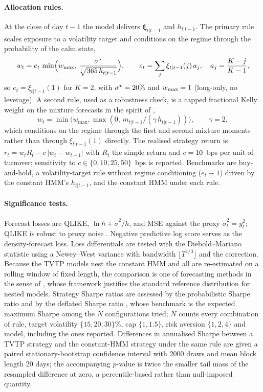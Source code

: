 \documentclass[11pt,a4paper]{article}
\newcommand{\bxi}{\bm{\xi}}
\begin{document}
\paragraph{Allocation rules.} At the close of day $t-1$ the model delivers $\bxi_{t|t-1}$ and $h_{t|t-1}$. The primary rule scales exposure to a volatility target and conditions on the regime through the probability of the calm state,
\begin{equation}\label{eq:rule}
w_t=e_t\,\min\Bigl(w_{\max},\,\frac{\sigma^\star}{\sqrt{365\,h_{t|t-1}}}\Bigr),\qquad e_t=\sum_j\xi_{t|t-1}(j)\,a_j,\quad a_j=\frac{K-j}{K-1},
\end{equation}
so $e_t=\xi_{t|t-1}(1)$ for $K=2$, with $\sigma^\star=20\%$ and $w_{\max}=1$ (long-only, no leverage). A second rule, used as a robustness check, is a capped fractional Kelly weight on the mixture forecasts in the spirit of \citet{angbekaert2002},
\begin{equation}\label{eq:kelly}
w_t=\min\bigl(w_{\max},\max(0,\,m_{t|t-1}/(\gamma\,h_{t|t-1}))\bigr),\qquad\gamma=2,
\end{equation}
which conditions on the regime through the first and second mixture moments rather than through $\xi_{t|t-1}(1)$ directly. The realised strategy return is $r_t=w_tR_t-c\,|w_t-w_{t-1}|$ with $R_t$ the simple return and $c=10$~bps per unit of turnover; sensitivity to $c\in\{0,10,25,50\}$~bps is reported. Benchmarks are buy-and-hold, a volatility-target rule without regime conditioning ($e_t\equiv1$) driven by the constant HMM's $h_{t|t-1}$, and the constant HMM under each rule.

\paragraph{Significance tests.} Forecast losses are QLIKE, $\ln h+\tilde\sigma^2/h$, and MSE against the proxy $\tilde\sigma^2_t=y_t^2$; QLIKE is robust to proxy noise \citep{patton2011}. Negative predictive log score serves as the density-forecast loss. Loss differentials are tested with the Diebold--Mariano statistic using a Newey--West variance \citep{neweywest1987} with bandwidth $\lfloor T^{1/3}\rfloor$ and the \citet{hln1997} correction. Because the TVTP models nest the constant HMM and all are re-estimated on a rolling window of fixed length, the comparison is one of forecasting methods in the sense of \citet{giacominiwhite2006}, whose framework justifies the standard reference distribution for nested models. Strategy Sharpe ratios are assessed by the probabilistic Sharpe ratio \citep{bailey2012psr} and by the deflated Sharpe ratio \citep{bailey2014dsr}, whose benchmark is the expected maximum Sharpe among the $N$ configurations tried; $N$ counts every combination of rule, target volatility $\{15,20,30\}\%$, cap $\{1,1.5\}$, risk aversion $\{1,2,4\}$ and model, including the ones reported. Differences in annualised Sharpe between a TVTP strategy and the constant-HMM strategy under the same rule are given a paired stationary-bootstrap confidence interval \citep{politisromano1994} with 2000 draws and mean block length 20 days; the accompanying $p$-value is twice the smaller tail mass of the resampled difference at zero, a percentile-based rather than null-imposed quantity.
\end{document}
